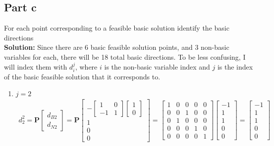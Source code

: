 \documentclass[11pt]{article}
\begin{document}
\subsection{Part c}
For each point corresponding to a feasible basic solution identify the basic directions
\\
\textbf{Solution: }
Since there are 6 basic feasible solution points, and 3 non-basic variables for each, there will be 18 total basic directions.
To be less confusing, I will index them with $d_i^j$, where $i$ is the non-basic variable index and $j$ is the index of the basic feasible solution that it corresponds to.
\begin{enumerate}
    \item $j = 2$
    \begin{align*} 
        d_2^2 = \textbf{P}
      \begin{bmatrix}
         d_{B2} \\ d_{N2}
      \end{bmatrix}
      =
      \textbf{P}
      \begin{bmatrix}
        -
        \begin{bmatrix}
         1 & 0 \\ -1 & 1   
        \end{bmatrix}
        \begin{bmatrix}
            1 \\ 0
        \end{bmatrix} \\
        1 \\ 0 \\ 0
      \end{bmatrix}
      = 
      \begin{bmatrix}
        1 & 0 & 0 & 0 & 0 \\
        0 & 0 & 1 & 0 & 0 \\
        0 & 1 & 0 & 0 & 0 \\
        0 & 0 & 0 & 1 & 0 \\
        0 & 0 & 0 & 0 & 1
      \end{bmatrix}
      \begin{bmatrix}
        -1 \\ 1 \\ 1 \\ 0 \\ 0 
      \end{bmatrix}
      =
      \begin{bmatrix}
        -1 \\ 1 \\ 1 \\ 0 \\ 0 

\end{bmatrix}
\end{align*}
\end{enumerate}
\end{document}
